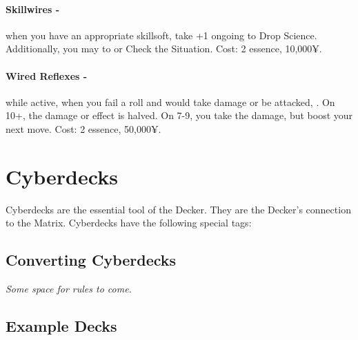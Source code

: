 \paragraph{Skillwires -} \label{skillwires} when you have an appropriate skillsoft, take +1 ongoing to Drop Science. Additionally, you may  to  or Check the Situation. Cost: 2 essence, 10,000¥.

\paragraph{Wired Reflexes -} while active, when you fail a roll and would take damage or be attacked, . On 10+, the damage or effect is halved. On 7-9, you take the damage, but boost your next move. Cost: 2 essence, 50,000¥.



\section{Cyberdecks}

Cyberdecks are the essential tool of the Decker. They are the Decker’s connection to the Matrix. Cyberdecks have the following special tags:


\subsection{Converting Cyberdecks}

\textit{Some space for rules to come.}


\subsection{Example Decks}

